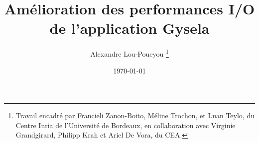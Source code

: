 \documentclass[systeme]{compas2026}
\begin{document}
\title{Amélioration des performances I/O de l'application Gysela}
\shorttitle{}

\author{Alexandre Lou-Poueyou \thanks{Travail encadré par Francieli Zanon-Boito, Méline Trochon, et Luan Teylo, du Centre Inria de l'Université de Bordeaux, en collaboration avec Virginie Grandgirard, Philipp Krah et Ariel De Vora, du CEA.}}%

\address{Université de Bordeaux,\\
Centre INRIA de l'université de Bordeaux - 200 Av. de la Vieille Tour\\
33400 Talence - France\\
alexandre.lou-poueyou@inria.fr}

\date{\today}

\maketitle
\end{document}
